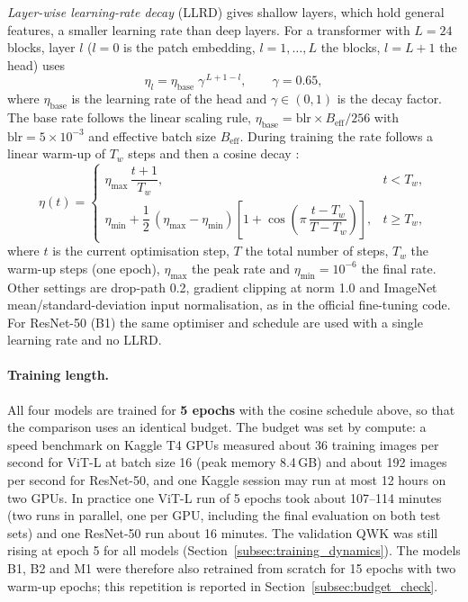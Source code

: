 \emph{Layer-wise learning-rate decay} (LLRD) gives shallow layers, which hold general features, a smaller learning rate than deep layers. For a transformer with $L=24$ blocks, layer $l$ ($l=0$ is the patch embedding, $l=1,\dots,L$ the blocks, $l=L+1$ the head) uses
\begin{equation}
    \eta_l = \eta_{\text{base}}\;\gamma^{\,L+1-l},\qquad \gamma = 0.65,
    \label{eq:llrd}
\end{equation}
where $\eta_{\text{base}}$ is the learning rate of the head and $\gamma\in(0,1)$ is the decay factor. The base rate follows the linear scaling rule, $\eta_{\text{base}} = \text{blr}\times B_{\text{eff}}/256$ with $\text{blr}=5\times10^{-3}$ and effective batch size $B_{\text{eff}}$. During training the rate follows a linear warm-up of $T_w$ steps and then a cosine decay \cite{sgdr2017}:
\begin{equation}
    \eta(t) =
    \begin{cases}
        \eta_{\max}\,\dfrac{t+1}{T_w}, & t < T_w,\\[2ex]
        \eta_{\min} + \dfrac{1}{2}\,(\eta_{\max}-\eta_{\min})\left[1+\cos\!\left(\pi\,\dfrac{t-T_w}{T-T_w}\right)\right], & t \ge T_w,
    \end{cases}
    \label{eq:cosine}
\end{equation}
where $t$ is the current optimisation step, $T$ the total number of steps, $T_w$ the warm-up steps (one epoch), $\eta_{\max}$ the peak rate and $\eta_{\min}=10^{-6}$ the final rate. Other settings are drop-path 0.2, gradient clipping at norm 1.0 and ImageNet mean/standard-deviation input normalisation, as in the official fine-tuning code. For ResNet-50 (B1) the same optimiser and schedule are used with a single learning rate and no LLRD.

\paragraph{Training length.} All four models are trained for \textbf{5 epochs} with the cosine schedule above, so that the comparison uses an identical budget. The budget was set by compute: a speed benchmark on Kaggle T4 GPUs measured about 36 training images per second for ViT-L at batch size 16 (peak memory 8.4\,GB) and about 192 images per second for ResNet-50, and one Kaggle session may run at most 12 hours on two GPUs. In practice one ViT-L run of 5 epochs took about 107--114 minutes (two runs in parallel, one per GPU, including the final evaluation on both test sets) and one ResNet-50 run about 16 minutes. The validation QWK was still rising at epoch 5 for all models (Section~\ref{subsec:training_dynamics}). The models B1, B2 and M1 were therefore also retrained from scratch for 15 epochs with two warm-up epochs; this repetition is reported in Section~\ref{subsec:budget_check}.

